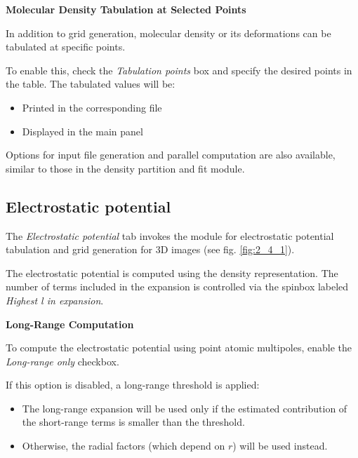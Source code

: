 \documentclass[10pt]{article}
\begin{document}
\vspace*{3mm}
{\bf Molecular Density Tabulation at Selected Points}
\vspace*{3mm}

In addition to grid generation, molecular density or its deformations
can be tabulated at specific points.

To enable this, check the {\it Tabulation points} box and specify the desired points in the table.
The tabulated values will be:

\begin{itemize}
\item Printed in the corresponding \out{ } file
\item Displayed in the main panel
\end{itemize}

Options for input file generation and parallel computation
are also available, similar to those in the density partition and fit module.

\subsection{Electrostatic potential \label{sec:2.4}}

The {\it Electrostatic potential} tab invokes the module for electrostatic potential tabulation
and grid generation for 3D images (see fig. \ref{fig:2_4_1}).

The electrostatic potential is computed using the density representation.
The number of terms included in the expansion is controlled via the spinbox labeled {\it Highest l in expansion}.

\vspace*{3mm}
{\bf Long-Range Computation}
\vspace*{3mm}

To compute the electrostatic potential using point atomic multipoles,
enable the {\it Long-range only} checkbox.

If this option is disabled, a long-range threshold is applied:

\begin{itemize}
\item The long-range expansion will be used only if the estimated contribution of the short-range terms
is smaller than the threshold.
\item Otherwise, the radial factors (which depend on $r$) will be used instead.
\end{itemize}
\end{document}
